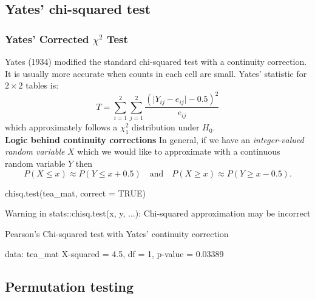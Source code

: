 \documentclass[a4paper]{article}\usepackage[]{graphicx}\usepackage[]{xcolor}
\begin{document}
\subsection{Yates' chi-squared test}
\subsubsection{Yates' Corrected \( \chi^2 \) Test}
Yates (1934) modified the standard chi-squared test with a continuity correction. It is usually more accurate when counts in each cell are small. Yates' statistic for \( 2 \times 2 \) tables is:
\[
	T = \sum_{i=1}^2\sum_{j=1}^2 \frac{(\lvert Y_{ij} - e_{ij} \rvert - 0.5)^2}{e_{ij}}
\]
which approximately follows a \( \chi^2_1 \) distribution under \( H_0 \).\\
\textbf{Logic behind continuity corrections}
In general, if we have an \textit{integer-valued random variable} \( X \) which we would like to approximate with a continuous random variable \( Y \) then
\[
	P(X \leq x) \approx P(Y \leq x + 0.5) \quad \text{and} \quad P(X \geq x) \approx P(Y \geq x - 0.5).
\]
\begin{Schunk}
\begin{Sinput}
chisq.test(tea_mat, correct = TRUE)
\end{Sinput}
\begin{Soutput}
Warning in stats::chisq.test(x, y, ...): Chi-squared approximation may be incorrect
\end{Soutput}
\begin{Soutput}

	Pearson's Chi-squared test with Yates' continuity correction

data:  tea_mat
X-squared = 4.5, df = 1, p-value = 0.03389
\end{Soutput}
\end{Schunk}
\subsection{Permutation testing}
\end{document}
